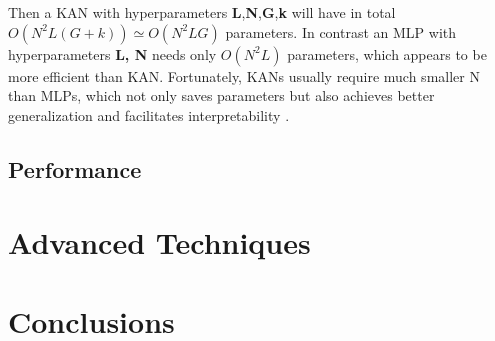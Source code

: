 \documentclass[12pt,a4paper]{article}
\begin{document}
Then a KAN with hyperparameters \textbf{L},\textbf{N},\textbf{G},\textbf{k} will have in total $O(N^2L(G + k))  \simeq O(N^2LG)$ parameters. In contrast an MLP with hyperparameters \textbf{L, N} needs only  $O(N^2L)$ parameters, which appears to be more efficient than KAN. Fortunately, KANs usually require much smaller N than MLPs, which not only saves parameters but also achieves better generalization and facilitates interpretability \cite{KAN}. 

\subsection{Performance}
\section{Advanced Techniques}
\section{Conclusions}


\end{document}
